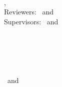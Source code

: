 \begin{titlepage}
	\thesisDate \\
	
\end{titlepage}


\hfill
\vfill
\small
\textbf{\thesisName} \\
\textit{\thesisTitle} \\
\thesisSubject, \thesisDate \\
Reviewers: \thesisFirstReviewer\ and \thesisSecondReviewer \\
Supervisors: \thesisFirstSupervisor\ and \thesisSecondSupervisor \\[1.5em]
\textbf{\thesisUniversity} \\
\textit{\thesisUniversityGroup} \\
\thesisUniversityInstitute \\
\thesisUniversityDepartment \\
\thesisUniversityStreetAddress \\
\thesisUniversityPostalCode\ and \thesisUniversityCity
